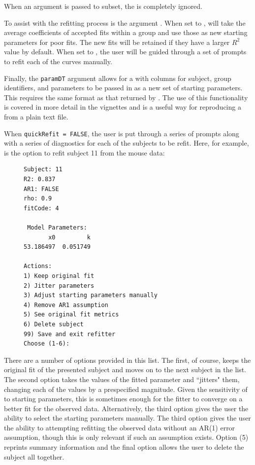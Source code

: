 When an argument is passed to subset, the  is completely ignored.

To assist with the refitting process is the argument . When set to ,  will take the average coefficients of accepted fits within a group and use those as new starting parameters for poor fits. The new fits will be retained if they have a larger $R^2$ value by default. When set to , the user will be guided through a set of prompts to refit each of the curves manually. 

Finally, the \texttt{paramDT} argument allows for a  with columns for subject, group identifiers, and parameters to be passed in as a new set of starting parameters. This  requires the same format as that returned by . The use of this functionality is covered in more detail in the  vignettes and is a useful way for reproducing a  from a plain text file. 

When \texttt{quickRefit = FALSE}, the user is put through a series of prompts along with a series of diagnostics for each of the subjects to be refit. Here, for example, is the option to refit subject 11 from the mouse data:


\begin{singlespace}
\begin{figure}[H]
\centering
\begin{BVerbatim}
Subject: 11
R2: 0.837
AR1: FALSE
rho: 0.9
fitCode: 4

 Model Parameters:
       x0         k 
53.186497  0.051749 

Actions:
1) Keep original fit
2) Jitter parameters
3) Adjust starting parameters manually
4) Remove AR1 assumption
5) See original fit metrics
6) Delete subject
99) Save and exit refitter
Choose (1-6):
\end{BVerbatim}
\end{figure}
\end{singlespace}

There are a number of options provided in this list. The first, of course, keeps the original fit of the presented subject and moves on to the next subject in the list. The second option takes the values of the fitted parameter and ``jitters" them, changing each of the values by a prespecified magnitude. Given the sensitivity of  to starting parameters, this is sometimes enough for the fitter to converge on a better fit for the observed data. Alternatively, the third option gives the user the ability to select the starting parameters manually. The third option gives the user the ability to attempting refitting the observed data without an AR(1) error assumption, though this is only relevant if such an assumption exists. Option (5) reprints summary information and the final option allows the user to delete the subject all together.

